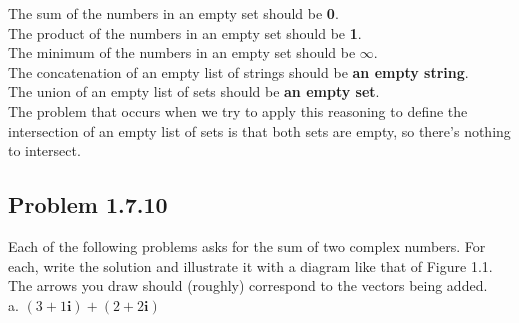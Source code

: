 \documentclass[
  letterpaper,
  DIV=11,
  numbers=noendperiod]{scrartcl}
\begin{document}
The sum of the numbers in an empty set should be \textbf{0}.\\
The product of the numbers in an empty set should be \textbf{1}.\\
The minimum of the numbers in an empty set should be \(\infty\).\\
The concatenation of an empty list of strings should be \textbf{an empty
string}.\\
The union of an empty list of sets should be \textbf{an empty set}.\\
The problem that occurs when we try to apply this reasoning to define
the intersection of an empty list of sets is that both sets are empty,
so there's nothing to intersect.

\hypertarget{problem-1.7.10}{%
\subsection{Problem 1.7.10}\label{problem-1.7.10}}

Each of the following problems asks for the sum of two complex numbers.
For each, write the solution and illustrate it with a diagram like that
of Figure 1.1. The arrows you draw should (roughly) correspond to the
vectors being added.\\
a. \((3 + 1\mathbf i) + (2 + 2\mathbf i)\)\\
\end{document}
